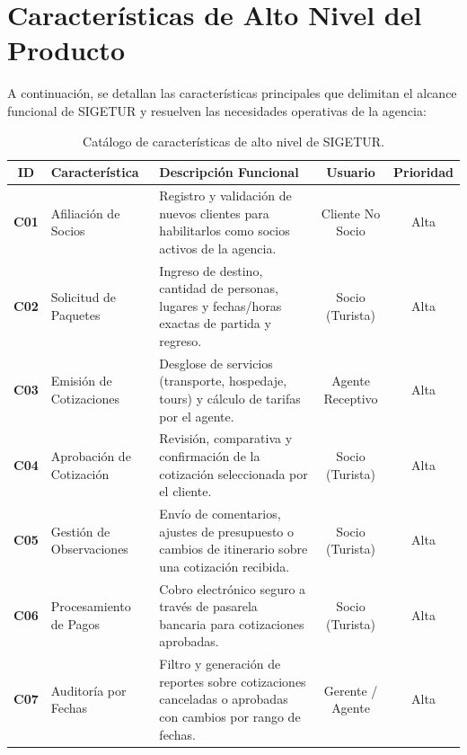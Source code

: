 \section{Características de Alto Nivel del Producto}
A continuación, se detallan las características principales que delimitan el alcance funcional de SIGETUR y resuelven las necesidades operativas de la agencia:

\begin{table}[H]
\centering
\footnotesize
\begin{tabularx}{\textwidth}{clLcc}
\toprule
\textbf{ID} & \textbf{Característica} & \textbf{Descripción Funcional} & \textbf{Usuario} & \textbf{Prioridad} \\
\midrule
\textbf{C01} & Afiliación de Socios & Registro y validación de nuevos clientes para habilitarlos como socios activos de la agencia. & Cliente No Socio & Alta \\
\textbf{C02} & Solicitud de Paquetes & Ingreso de destino, cantidad de personas, lugares y fechas/horas exactas de partida y regreso. & Socio (Turista) & Alta \\
\textbf{C03} & Emisión de Cotizaciones & Desglose de servicios (transporte, hospedaje, tours) y cálculo de tarifas por el agente. & Agente Receptivo & Alta \\
\textbf{C04} & Aprobación de Cotización & Revisión, comparativa y confirmación de la cotización seleccionada por el cliente. & Socio (Turista) & Alta \\
\textbf{C05} & Gestión de Observaciones & Envío de comentarios, ajustes de presupuesto o cambios de itinerario sobre una cotización recibida. & Socio (Turista) & Alta \\
\textbf{C06} & Procesamiento de Pagos & Cobro electrónico seguro a través de pasarela bancaria para cotizaciones aprobadas. & Socio (Turista) & Alta \\
\textbf{C07} & Auditoría por Fechas & Filtro y generación de reportes sobre cotizaciones canceladas o aprobadas con cambios por rango de fechas. & Gerente / Agente & Alta \\
\bottomrule
\end{tabularx}
\caption{Catálogo de características de alto nivel de SIGETUR.}\label{tab:caracteristicas}
\end{table}
